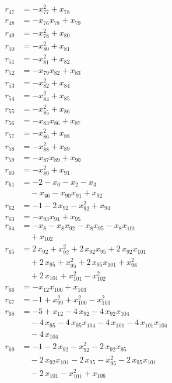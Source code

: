 \begin{align*}
r_{47} &= -x_{77}^{2} + x_{78} \\
r_{48} &= -x_{76} x_{78} + x_{79} \\
r_{49} &= -x_{78}^{2} + x_{80} \\
r_{50} &= -x_{80}^{2} + x_{81} \\
r_{51} &= -x_{81}^{2} + x_{82} \\
r_{52} &= -x_{79} x_{82} + x_{83} \\
r_{53} &= -x_{82}^{2} + x_{84} \\
r_{54} &= -x_{84}^{2} + x_{85} \\
r_{55} &= -x_{85}^{2} + x_{86} \\
r_{56} &= -x_{83} x_{86} + x_{87} \\
r_{57} &= -x_{86}^{2} + x_{88} \\
r_{58} &= -x_{88}^{2} + x_{89} \\
r_{59} &= -x_{87} x_{89} + x_{90} \\
r_{60} &= -x_{89}^{2} + x_{91} \\
r_{61} &= -2 - x_{0} - x_{2} - x_{3} \\
&\quad{}- x_{46} - x_{90} x_{91} + x_{92} \\
r_{62} &= -1 - 2\,x_{92} - x_{92}^{2} + x_{94} \\
r_{63} &= -x_{93} x_{94} + x_{95} \\
r_{64} &= -x_{8} - x_{8} x_{92} - x_{8} x_{95} - x_{8} x_{101} \\
&\quad{}+ x_{102} \\
r_{65} &= 2\,x_{92} + x_{92}^{2} + 2\,x_{92} x_{95} + 2\,x_{92} x_{101} \\
&\quad{}+ 2\,x_{95} + x_{95}^{2} + 2\,x_{95} x_{101} + x_{98}^{2} \\
&\quad{}+ 2\,x_{101} + x_{101}^{2} - x_{102}^{2} \\
r_{66} &= -x_{12} x_{100} + x_{103} \\
r_{67} &= -1 + x_{99}^{2} + x_{100}^{2} - x_{103}^{2} \\
r_{68} &= -5 + x_{12} - 4\,x_{92} - 4\,x_{92} x_{104} \\
&\quad{}- 4\,x_{95} - 4\,x_{95} x_{104} - 4\,x_{101} - 4\,x_{101} x_{104} \\
&\quad{}- 4\,x_{104} \\
r_{69} &= -1 - 2\,x_{92} - x_{92}^{2} - 2\,x_{92} x_{95} \\
&\quad{}- 2\,x_{92} x_{101} - 2\,x_{95} - x_{95}^{2} - 2\,x_{95} x_{101} \\
&\quad{}- 2\,x_{101} - x_{101}^{2} + x_{106} \\

\end{align*}
